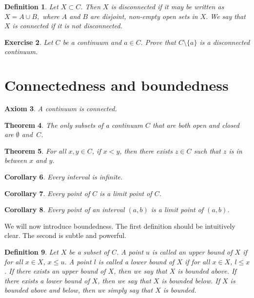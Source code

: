 \documentclass{amsart}
\newtheorem{theorem}{Theorem}
\newtheorem{axiom}[theorem]{Axiom}
\newtheorem{definition}[theorem]{Definition}
\newtheorem{corollary}[theorem]{Corollary}
\newtheorem{exercise}[theorem]{Exercise}
\newcommand{\1}{\mathds{1}}
\numberwithin{equation}{section}
\numberwithin{theorem}{section}
\begin{document}
\begin{definition}
Let $X\subset C$. Then $X$ is {\it disconnected} if it may be written as $X=A\cup B,$ where $A$ and $B$ are disjoint, non-empty open sets in $X.$  We say that $X$ is {\it connected} if it is not disconnected.
\end{definition} 


\begin{exercise} Let $C$ be a continuum and $a\in C.$ Prove that $C\setminus\{a\}$ is a disconnected continuum.
\end{exercise} 



\section{Connectedness and boundedness}


\begin{axiom}
A continuum is connected.
\end{axiom}

\begin{theorem}
The only subsets of a continuum $C$ that are both open and closed are $\emptyset$ and~$C$.
\end{theorem}

\begin{theorem}
For all $x, y \in C$, if $x < y$, then there exists $z \in C$ such that $z$ is in between $x$ and $y$.
\end{theorem}

\begin{corollary}
Every interval is infinite.
\end{corollary}

\begin{corollary}  Every point of $C$ is a limit point of $C$.  
\end{corollary}

\begin{corollary} 
Every point of an interval $(a,b)$ is a limit point of $(a,b)$.
\end{corollary}




We will now introduce boundedness.   The first definition should be intuitively clear.  The second is subtle and powerful.  


\begin{definition}  Let $X$ be a subset of $C$.  A point $u$ is called an \emph{upper bound} of $X$ if for all $x \in X$, $x \leq u$.  A point $l$ is called a \emph{lower bound} of $X$ if for all $x \in X$, $l \leq x$.  If there exists an upper bound of $X$, then we say that $X$ is \emph{bounded above}.  If there exists a lower bound of $X$, then we say that $X$ is \emph{bounded below}.  If $X$ is bounded above and below, then we simply say that $X$ is \emph{bounded}.
\end{definition}
\end{document}
